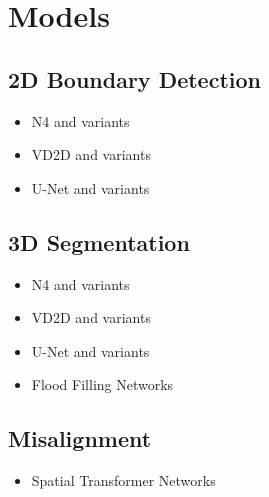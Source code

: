 \section{Models}

\subsection{2D Boundary Detection}

\begin{itemize}
	\item N4 and variants
	\item VD2D and variants
	\item U-Net and variants
\end{itemize}

\subsection{3D Segmentation}

\begin{itemize}
	\item N4 and variants
	\item VD2D and variants
	\item U-Net and variants
	\item Flood Filling Networks
\end{itemize}

\subsection{Misalignment}

\begin{itemize}
	\item Spatial Transformer Networks
\end{itemize}